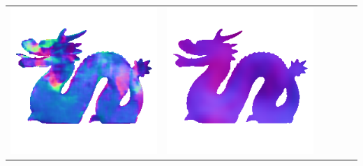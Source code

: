\begin{tabularx}{\linewidth}{@{}Y@{}Y@{}Y@{}Y@{}Y@{}Y@{}}
\includegraphics[width=\linewidth]{semisynthetic/20160617_21_marrnet_out.png} &
\includegraphics[width=\linewidth]{semisynthetic/20160617_21_ef_out.png} \\

\end{tabularx}
